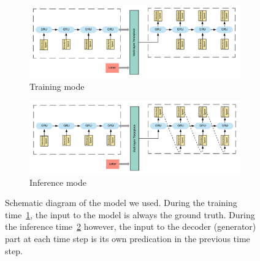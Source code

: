     \begin{figure}[htbp!]
        \centering
        \begin{subfigure}{1.0\textwidth}
            \centering
            \includegraphics[scale=0.7]{images/framework/training_mode.png}
            \caption{Training mode\label{fig:training_mode}}
        \end{subfigure}
        \begin{subfigure}{1.0\textwidth}
            \centering
            \includegraphics[scale=0.7]{images/framework/inference_mode.png}
            \caption{Inference mode\label{fig:inf_mode}}
        \end{subfigure}
        \caption{Schematic diagram of the model we used. During the training time~\ref{fig:training_mode}, the input to the model is always the ground truth. During the inference time~\ref{fig:inf_mode} however, the input to the decoder (generator) part at each time step is its own predication in the previous time step.}
        \label{fig:model_arch}
    \end{figure}


